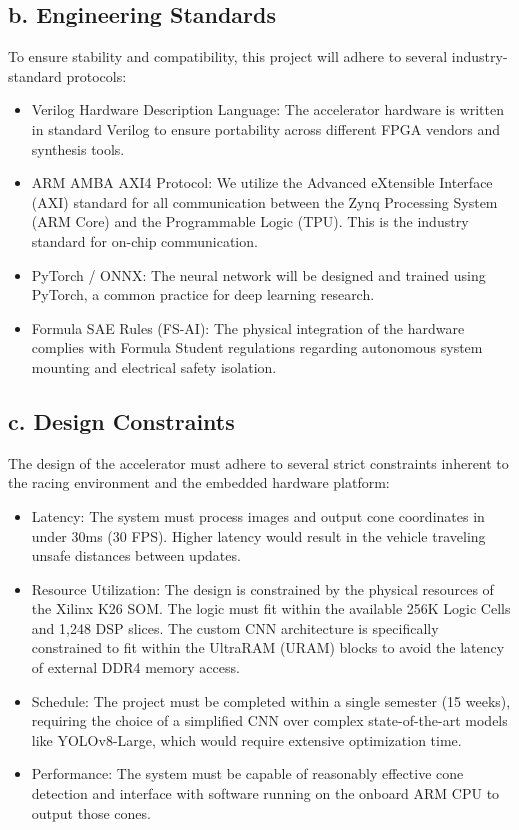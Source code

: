 \documentclass[11pt,a4paper,twoside]{article}
\begin{document}
\subsection{b. Engineering Standards} To ensure stability and compatibility, this project will adhere to several industry-standard protocols:

\begin{itemize} 
    \item Verilog Hardware Description Language: The accelerator hardware is written in standard Verilog to ensure portability across different FPGA vendors and synthesis tools. 
    \item ARM AMBA AXI4 Protocol: We utilize the Advanced eXtensible Interface (AXI) standard for all communication between the Zynq Processing System (ARM Core) and the Programmable Logic (TPU). This is the industry standard for on-chip communication. 
    \item PyTorch / ONNX: The neural network will be designed and trained using PyTorch, a common practice for deep learning research.
    \item Formula SAE Rules (FS-AI): The physical integration of the hardware complies with Formula Student regulations regarding autonomous system mounting and electrical safety isolation. 
\end{itemize}

\subsection{c. Design Constraints} The design of the accelerator must adhere to several strict constraints inherent to the racing environment and the embedded hardware platform:

\begin{itemize} 
    \item Latency: The system must process images and output cone coordinates in under 30ms (30 FPS). Higher latency would result in the vehicle traveling unsafe distances between updates. 
    \item Resource Utilization: The design is constrained by the physical resources of the Xilinx K26 SOM. The logic must fit within the available 256K Logic Cells and 1,248 DSP slices. The custom CNN architecture is specifically constrained to fit within the UltraRAM (URAM) blocks to avoid the latency of external DDR4 memory access. 
    \item Schedule: The project must be completed within a single semester (15 weeks), requiring the choice of a simplified CNN over complex state-of-the-art models like YOLOv8-Large, which would require extensive optimization time. 
    \item Performance: The system must be capable of reasonably effective cone detection and interface with software running on the onboard ARM CPU to output those cones. 
\end{itemize}
\end{document}
